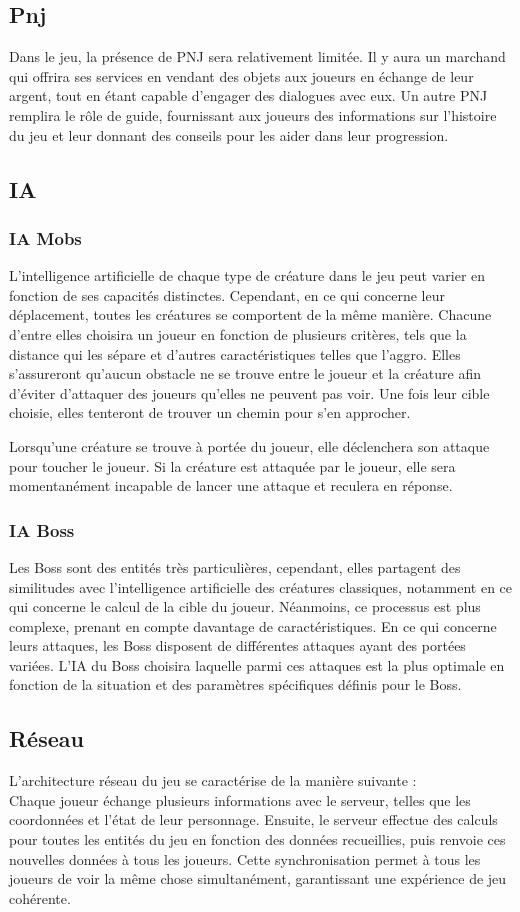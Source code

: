 \documentclass{article}
\begin{document}
\subsection{Pnj}
Dans le jeu, la présence de PNJ sera relativement limitée. Il y aura un marchand qui offrira ses services en vendant des objets aux joueurs en échange de leur argent, tout en étant capable d'engager des dialogues avec eux. Un autre PNJ remplira le rôle de guide, fournissant aux joueurs des informations sur l'histoire du jeu et leur donnant des conseils pour les aider dans leur progression.
\subsection{IA}
\subsubsection{IA Mobs}
L'intelligence artificielle de chaque type de créature dans le jeu peut varier en fonction de ses capacités distinctes. Cependant, en ce qui concerne leur déplacement, toutes les créatures se comportent de la même manière. Chacune d'entre elles choisira un joueur en fonction de plusieurs critères, tels que la distance qui les sépare et d'autres caractéristiques telles que l'aggro. Elles s'assureront qu'aucun obstacle ne se trouve entre le joueur et la créature afin d'éviter d'attaquer des joueurs qu'elles ne peuvent pas voir. Une fois leur cible choisie, elles tenteront de trouver un chemin pour s'en approcher.

Lorsqu'une créature se trouve à portée du joueur, elle déclenchera son attaque pour toucher le joueur. Si la créature est attaquée par le joueur, elle sera momentanément incapable de lancer une attaque et reculera en réponse.
\subsubsection{IA Boss}
Les Boss sont des entités très particulières, cependant, elles partagent des similitudes avec l'intelligence artificielle des créatures classiques, notamment en ce qui concerne le calcul de la cible du joueur. Néanmoins, ce processus est plus complexe, prenant en compte davantage de caractéristiques. En ce qui concerne leurs attaques, les Boss disposent de différentes attaques ayant des portées variées. L'IA du Boss choisira laquelle parmi ces attaques est la plus optimale en fonction de la situation et des paramètres spécifiques définis pour le Boss.
\pagebreak
\subsection{Réseau}
L'architecture réseau du jeu se caractérise de la manière suivante : \\
Chaque joueur échange plusieurs informations avec le serveur, telles que les coordonnées et l'état de leur personnage. Ensuite, le serveur effectue des calculs pour toutes les entités du jeu en fonction des données recueillies, puis renvoie ces nouvelles données à tous les joueurs. Cette synchronisation permet à tous les joueurs de voir la même chose simultanément, garantissant une expérience de jeu cohérente.\\
\end{document}
